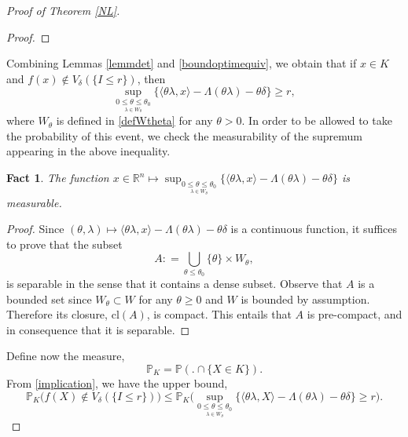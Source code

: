 \documentclass[aop,preprint]{imsart}
\newcommand\RR{\mathbb{R}}
\newcommand\PP{\mathbb{P}}
\numberwithin{equation}{section}
\theoremstyle{definition}
\theoremstyle{plain}
\newtheorem{fact}[Def]{Fact}
\theoremstyle{remark}
\begin{document}
\begin{proof}[Proof of Theorem \ref{NL}]
\begin{proof}
\end{proof}
Combining Lemmas \ref{lemmdet} and \ref{boundoptimequiv}, we obtain that if $x \in K$ and $f(x) \notin V_\delta(\{I\leq r\})$, then
\begin{equation} \label{implication} \sup_{ \underset{\lambda \in  W_{\theta}}{0 \leq \theta \leq \theta_0} } \{ \langle \theta \lambda , x\rangle - \Lambda(\theta\lambda)-\theta \delta\}\geq r,\end{equation}
where $W_\theta$ is defined in \eqref{defWtheta} for any $\theta>0$. In order to be allowed to take the probability of this event, we check the measurability of the supremum appearing in the above inequality.
\begin{fact}
The function $x \in \RR^n \mapsto  \sup_{ \underset{\lambda \in  W_{\theta}}{0 \leq \theta \leq \theta_0} } \{ \langle \theta \lambda , x\rangle - \Lambda(\theta\lambda)-\theta \delta\}$ is measurable.
\end{fact}
\begin{proof}
Since $(\theta,\lambda) \mapsto  \langle \theta \lambda , x\rangle - \Lambda(\theta\lambda)-\theta \delta$ is a continuous function, it suffices to prove that the subset 
$$ A : =\bigcup_{\theta \leq \theta_0} \{\theta\}\times W_\theta,$$
is separable in the sense that it contains a dense subset. Observe that $A$ is a bounded set since $W_\theta \subset W$ for any $\theta \geq0$ and $W$ is bounded by assumption. Therefore its closure, $\mathrm{cl}(A)$, is compact. This entails that $A$ is pre-compact, and in consequence that it is separable.

\end{proof}
Define now the measure, 
$$\PP_{K} = \PP( . \cap \{X \in K\}).$$
From \eqref{implication}, we have the upper bound,
\begin{equation} \label{unionprete} \PP_K\big( f(X) \notin V_{\delta}(\{I\leq r\}) \big)\leq \PP_K\big( \sup_{ \underset{\lambda \in  W_{\theta}}{0 \leq \theta \leq \theta_0}}  \{ \langle \theta \lambda , X\rangle - \Lambda(\theta\lambda) - \theta \delta\} \geq r\big).\end{equation}


\end{proof}
\end{document}
